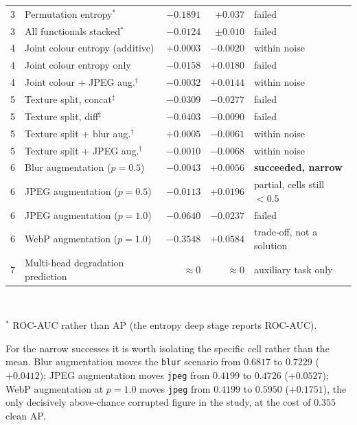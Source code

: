 \begin{table}[t]
\begin{tabular}{llrrl}
    3 & Permutation entropy$^{*}$                & $-0.1891$ & $+0.037$ & failed \\
    3 & All functionals stacked$^{*}$            & $-0.0124$ & $\pm0.010$ & failed \\
    \midrule
    4 & Joint colour entropy (additive)          & $+0.0003$ & $-0.0020$ & within noise \\
    4 & Joint colour entropy only                & $-0.0158$ & $+0.0180$ & failed \\
    4 & Joint colour + JPEG aug.$^\dagger$       & $-0.0032$ & $+0.0144$ & within noise \\
    \midrule
    5 & Texture split, concat$^\ddagger$         & $-0.0309$ & $-0.0277$ & failed \\
    5 & Texture split, diff$^\ddagger$           & $-0.0403$ & $-0.0090$ & failed \\
    5 & Texture split + blur aug.$^\dagger$      & $+0.0005$ & $-0.0061$ & within noise \\
    5 & Texture split + JPEG aug.$^\dagger$      & $-0.0010$ & $-0.0068$ & within noise \\
    \midrule
    6 & Blur augmentation ($p=0.5$)              & $-0.0043$ & $\mathbf{+0.0056}$ & \textbf{succeeded, narrow} \\
    6 & JPEG augmentation ($p=0.5$)              & $-0.0113$ & $+0.0196$ & partial, cells still $<0.5$ \\
    6 & JPEG augmentation ($p=1.0$)              & $-0.0640$ & $-0.0237$ & failed \\
    6 & WebP augmentation ($p=1.0$)              & $-0.3548$ & $\mathbf{+0.0584}$ & trade-off, not a solution \\
    \midrule
    7 & Multi-head degradation prediction        & $\approx 0$ & $\approx 0$ & auxiliary task only \\
    \bottomrule
  \end{tabular}
  \\[2pt]
  \raggedright\footnotesize
  $^{*}$ ROC-AUC rather than AP (the entropy deep stage reports ROC-AUC).
\end{table}

For the narrow successes it is worth isolating the specific cell rather than the
mean. Blur augmentation moves the \texttt{blur} scenario from $0.6817$ to
$0.7229$ ($+0.0412$); JPEG augmentation moves \texttt{jpeg} from $0.4199$ to
$0.4726$ ($+0.0527$); WebP augmentation at $p=1.0$ moves \texttt{jpeg} from
$0.4199$ to $0.5950$ ($+0.1751$), the only decisively above-chance corrupted
figure in the study, at the cost of $0.355$ clean AP.

